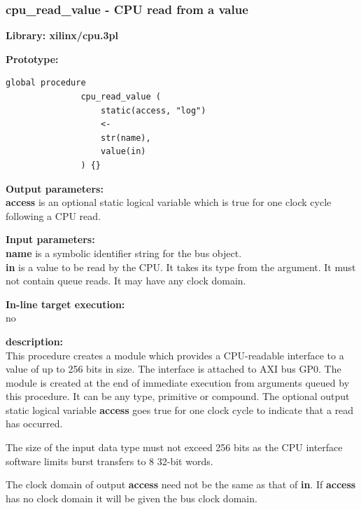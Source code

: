         \subsubsection{cpu\_read\_value - CPU read from a
                                                value}\label{sec:lpcpurdvalue}

            {\bf Library: xilinx/cpu.3pl}

            {\bf Prototype:} \\
            \vsp
            \begin{lstlisting}[gobble=12, language=threepl]
               global procedure
               cpu_read_value (
                   static(access, "log")
                   <-
                   str(name),
                   value(in)
               ) {}
            \end{lstlisting}

            {\bf Output parameters:} \\
            {\bf access} is an optional static logical variable which is true
            for one clock cycle following a CPU read.

            {\bf Input parameters:} \\
            {\bf name} is a symbolic identifier string for the bus object.\\
            {\bf in} is a value to be read by the CPU. It takes its type from
            the argument. It must not contain queue reads. It may have any
            clock domain.
        
            {\bf In-line target execution:} \\
            no
            
            {\bf description:} \\
            This procedure creates a module which provides a CPU-readable
            interface to a value of up to 256 bits in size. The
            interface is attached to AXI bus GP0. The module is created
            at the end of immediate execution from arguments queued by this
            procedure. It can be any type, primitive or compound. The optional
            output static logical variable {\bf access} goes true for one clock
            cycle to indicate that a read has occurred.
            
            The size of the input data type must not exceed 256 bits as the CPU
            interface software limits burst transfers to 8 32-bit words.
            
            The clock domain of output {\bf access} need not be the same as
            that of {\bf in}. If {\bf access} has no clock domain it will be
            given the bus clock domain.
            

